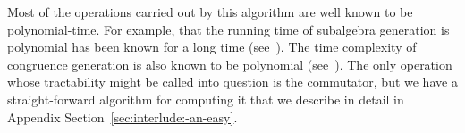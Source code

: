 \documentclass[12pt,xcolor=dvipsnames%
   ]{beamer}
\renewcommand{\cite}[1]{\relax}
\begin{document}
\begin{frame}
\begin{note}
    Most of the operations carried out by this algorithm are well known to be
    polynomial-time.  For example, that the running time of subalgebra generation is
    polynomial has been known for a long time (see~\cite{MR0455543}).
    The time complexity of congruence generation is also known to be polynomial
    (see~\cite{MR2470585}).  The only operation whose tractability might be 
    called into question is the commutator, but we have a straight-forward 
    algorithm for computing it that we describe in detail in 
    Appendix Section~\ref{sec:interlude:-an-easy}.
\end{note}
\end{frame}
\end{document}
